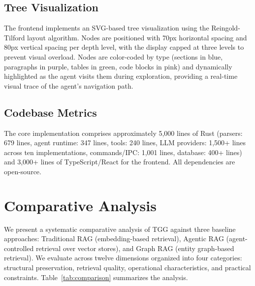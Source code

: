 \documentclass[conference]{IEEEtran}
\begin{document}
\subsection{Tree Visualization}

The frontend implements an SVG-based tree visualization using the Reingold-Tilford layout algorithm. Nodes are positioned with 70px horizontal spacing and 80px vertical spacing per depth level, with the display capped at three levels to prevent visual overload. Nodes are color-coded by type (sections in blue, paragraphs in purple, tables in green, code blocks in pink) and dynamically highlighted as the agent visits them during exploration, providing a real-time visual trace of the agent's navigation path.

\subsection{Codebase Metrics}

The core implementation comprises approximately 5,000 lines of Rust (parsers: 679 lines, agent runtime: 347 lines, tools: 240 lines, LLM providers: 1,500+ lines across ten implementations, commands/IPC: 1,001 lines, database: 400+ lines) and 3,000+ lines of TypeScript/React for the frontend. All dependencies are open-source.

\section{Comparative Analysis}

We present a systematic comparative analysis of TGG against three baseline approaches: Traditional RAG (embedding-based retrieval), Agentic RAG (agent-controlled retrieval over vector stores), and Graph RAG (entity graph-based retrieval). We evaluate across twelve dimensions organized into four categories: structural preservation, retrieval quality, operational characteristics, and practical constraints. Table~\ref{tab:comparison} summarizes the analysis.
\end{document}
